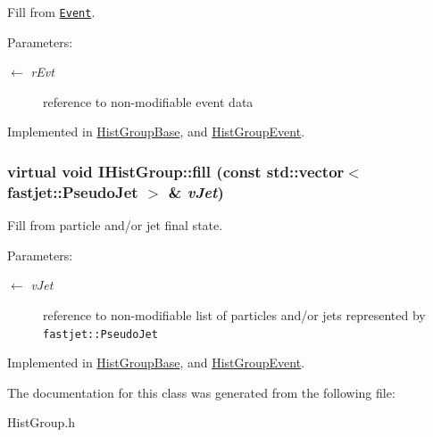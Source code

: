 Fill from {\tt \hyperlink{classEvent}{Event}}. 

\begin{Desc}
\item[Parameters:]
\begin{description}
\item[\mbox{$\leftarrow$} {\em r\-Evt}]reference to non-modifiable event data \end{description}
\end{Desc}


Implemented in \hyperlink{classHistGroupBase_746a5fc493cc64c27e8274757034ecec}{Hist\-Group\-Base}, and \hyperlink{classHistGroupEvent_78f86b37c41ad91e5d14cfd082e64658}{Hist\-Group\-Event}.\hypertarget{classIHistGroup_72fe456887f185ecbd538bdda92a9f5a}{
\subsubsection[fill]{\setlength{\rightskip}{0pt plus 5cm}virtual void IHist\-Group::fill (const std::vector$<$ fastjet::Pseudo\-Jet $>$ \& {\em v\-Jet})}}
\label{classIHistGroup_72fe456887f185ecbd538bdda92a9f5a}


Fill from particle and/or jet final state. 

\begin{Desc}
\item[Parameters:]
\begin{description}
\item[\mbox{$\leftarrow$} {\em v\-Jet}]reference to non-modifiable list of particles and/or jets represented by {\tt fastjet::Pseudo\-Jet} \end{description}
\end{Desc}


Implemented in \hyperlink{classHistGroupBase_ea81dcbe971622e6c6f4f8c5bea582d2}{Hist\-Group\-Base}, and \hyperlink{classHistGroupEvent_7cdf3dd95af609b72fa981a389a21070}{Hist\-Group\-Event}.

The documentation for this class was generated from the following file:\begin{CompactItemize}
\item 
Hist\-Group.h\end{CompactItemize}
